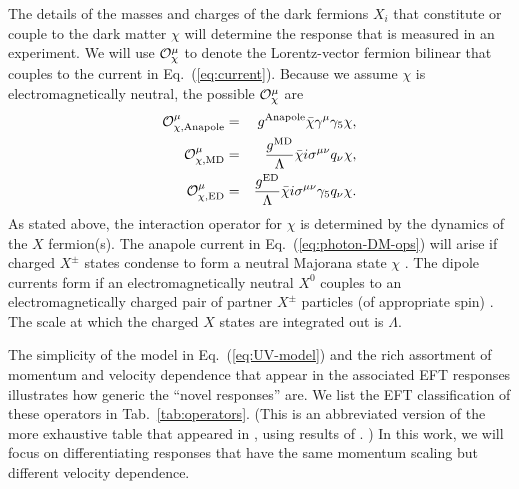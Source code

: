 \documentclass[11pt]{article}
\newcommand{\Eq}[1]{Eq.~(\ref{#1})} \newcommand{\Eqs}[2]{Eqs.~(\ref{#1}) and (\ref{#2})} \newcommand{\Eqm}[2]{Eqs.~(\ref{#1}) through (\ref{#2})}
\newcommand{\Tab}[1]{Tab.~\ref{#1}}
\begin{document}
The details of the masses and charges of the dark fermions $X_i$ that constitute or couple to the dark matter $\chi$ will determine the response that is measured in an experiment. We will use ${\cal O}_\chi^\mu$ to denote the Lorentz-vector fermion bilinear that couples to the current in \Eq{eq:current}. Because we assume $\chi$ is electromagnetically neutral, the possible ${\cal O}_\chi^\mu$ are \cite{Gresham:2014vja, Gluscevic:2015sqa}
\begin{eqnarray} \label{eq:photon-DM-ops}
{\cal O}_{\rm \chi, Anapole}^\mu & = & g^{\rm Anapole}\bar \chi \gamma^\mu \gamma_5 \chi, \\
{\cal O}_{\rm \chi, MD}^\mu & = & \frac{g^{\rm MD}}{\Lambda}\bar \chi i \sigma^{\mu \nu} q_\nu \chi ,\\
{\cal O}_{\rm \chi, ED}^\mu & = & \frac{g^{\rm ED}}{\Lambda} \bar \chi i \sigma^{\mu \nu} \gamma_5 q_\nu \chi.
\end{eqnarray}
As stated above, the interaction operator for $\chi$ is determined by the dynamics of the $X$ fermion(s). The anapole current in \Eq{eq:photon-DM-ops} will arise if charged $X^\pm$ states condense to form a neutral Majorana state $\chi$ \cite{Bagnasco:1993st}. The dipole currents form if an electromagnetically neutral $X^0$ couples to an electromagnetically charged pair of partner $X^\pm$ particles (of appropriate spin) \cite{Weiner:2012gm}. The scale at which the charged $X$ states are integrated out is $\Lambda$.

The simplicity of the model in \Eq{eq:UV-model} and the rich assortment of momentum and velocity dependence that appear in the associated EFT responses illustrates how generic the ``novel responses'' are. We list the EFT classification of these operators in \Tab{tab:operators}. (This is an abbreviated version of the more exhaustive table that appeared in \cite{Gluscevic:2015sqa}, using results of \cite{Gresham:2014vja, Gluscevic:2015sqa}.%
) In this work, we will focus on differentiating responses that have the same momentum scaling but different velocity dependence.
\end{document}
